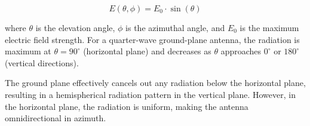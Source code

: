 \[
E(\theta, \phi) = E_0 \cdot \sin(\theta)
\]

where \( \theta \) is the elevation angle, \( \phi \) is the azimuthal angle, and \( E_0 \) is the maximum electric field strength. For a quarter-wave ground-plane antenna, the radiation is maximum at \( \theta = 90^\circ \) (horizontal plane) and decreases as \( \theta \) approaches \( 0^\circ \) or \( 180^\circ \) (vertical directions).

The ground plane effectively cancels out any radiation below the horizontal plane, resulting in a hemispherical radiation pattern in the vertical plane. However, in the horizontal plane, the radiation is uniform, making the antenna omnidirectional in azimuth.

